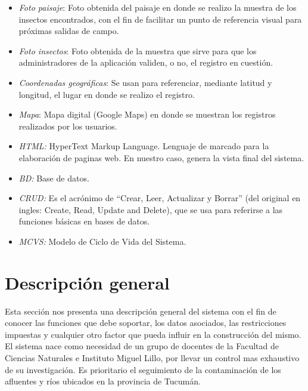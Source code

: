 \begin{itemize}
        \item \emph{Foto paisaje}: Foto obtenida del paisaje en donde se realizo la muestra de los insectos encontrados, con el fin de facilitar un punto de referencia visual para próximas salidas de campo.
        
        \item \emph{Foto insectos}: Foto obtenida de la muestra que sirve para que los administradores de la aplicación validen, o no, el registro en cuestión.
        
        \item \emph{Coordenadas geográficas}: Se usan para referenciar, mediante latitud y longitud, el lugar en donde se realizo el registro.
        
        \item \emph{Mapa}: Mapa digital (Google Maps) en donde se muestran los registros realizados por los usuarios.
        
        \item \emph{HTML:} HyperText Markup Language. Lenguaje de marcado para la elaboración de paginas web. En nuestro caso, genera la vista final del sistema.
        
        \item \emph{BD:} Base de datos.
        
        \item \emph{CRUD:} Es el acrónimo de ``Crear, Leer, Actualizar y Borrar'' (del original en ingles: Create, Read, Update and Delete), que se usa para referirse a las funciones básicas en bases de datos.
        
        \item \emph{MCVS:} Modelo de Ciclo de Vida del Sistema.
      \end{itemize}

  \section{Descripción general}

    Esta sección nos presenta una descripción general del sistema con el fin de conocer las funciones que debe soportar, los datos asociados, las restricciones impuestas y cualquier otro factor que pueda influir en la construcción del mismo.
    El sistema nace como necesidad de un grupo de docentes de la Facultad de Ciencias Naturales e Instituto Miguel Lillo, por llevar un control mas exhaustivo de su investigación.
    Es prioritario el seguimiento de la contaminación de los afluentes y ríos ubicados en la provincia de Tucumán.

